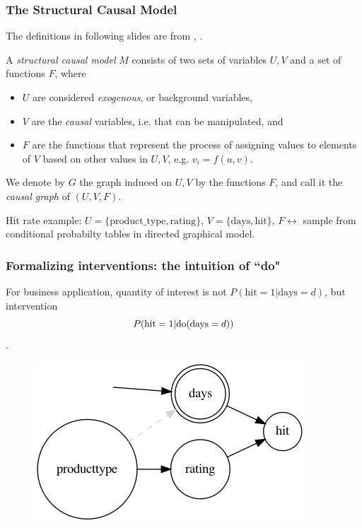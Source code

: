 \begin{frame}
    \frametitle{The Structural Causal Model}
    The definitions in following slides are from \cite{pearl2007mathematics}, \cite{pearl2016causal}.
\begin{definition}
    A \emph{structural causal model} $M$ consists of two sets of variables $U, V$ and a set of functions $F$, where

    \begin{itemize}
        \item $U$ are considered \emph{exogenous}, or background variables,
        \item $V$ are the \emph{causal} variables, i.e. that can be manipulated, and
        \item $F$ are the functions that represent the process of assigning values to elements of $V$ based on other values in $U, V$, e.g. $v_i = f(u, v)$.
    \end{itemize}

    We denote by $G$ the graph induced on $U, V$ by the functions $F$, and call it the \emph{causal graph} of $(U, V, F)$.\newline
\end{definition}

Hit rate example: $U = \{\textrm{product\_type}, \textrm{rating}\}$, $V= \{\textrm{days}, \textrm{hit}\}$, $F\leftrightarrow$ sample from conditional probabilty tables in directed graphical model.
\end{frame}


\begin{frame}
    \frametitle{Formalizing interventions: the intuition of ``do"}
    For business application, quantity of interest is not $P(\textrm{hit}=1 | \textrm{days}=d)$, but intervention $$P(\textrm{hit}=1 | \mathrm{do}(\textrm{days}=d))$$.\newline
    \begin{figure}[ht]
        \includegraphics[height=0.4\textwidth]{graphics/do_days}
    \end{figure}
\end{frame}


